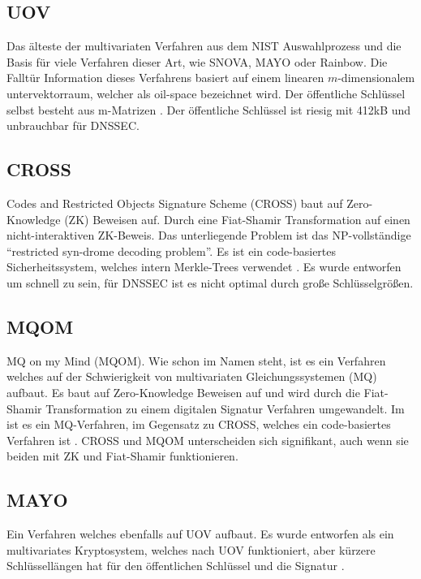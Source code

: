 \subsection{UOV}
Das älteste der multivariaten Verfahren aus dem NIST Auswahlprozess und die Basis für viele Verfahren dieser Art, wie SNOVA, MAYO oder Rainbow.
Die Falltür Information dieses Verfahrens basiert auf einem linearen $m$-dimensionalem untervektorraum, welcher als oil-space bezeichnet wird.
Der öffentliche Schlüssel selbst besteht aus m-Matrizen \cite{saarinenPostQuantumCryptography15th2024}.
Der öffentliche Schlüssel ist riesig mit 412kB und unbrauchbar für DNSSEC.

\subsection{CROSS}
Codes and Restricted Objects Signature Scheme (CROSS) baut auf Zero-Knowledge (ZK) Beweisen auf.
Durch eine Fiat-Shamir Transformation auf einen nicht-interaktiven ZK-Beweis.
Das unterliegende Problem ist das NP-vollständige \enquote{restricted syn-drome decoding problem}.
Es ist ein code-basiertes Sicherheitssystem, welches intern Merkle-Trees verwendet \cite{baldiAlgorithmSpecificationsSupporting2025,saarinenPostQuantumCryptography15th2024}.
Es wurde entworfen um schnell zu sein, für DNSSEC ist es nicht optimal durch große Schlüsselgrößen.

\subsection{MQOM}
MQ on my Mind (MQOM).
Wie schon im Namen steht, ist es ein Verfahren welches auf der Schwierigkeit von multivariaten Gleichungssystemen (MQ) aufbaut.
Es baut auf Zero-Knowledge Beweisen auf und wird durch die Fiat-Shamir Transformation zu einem digitalen Signatur Verfahren umgewandelt.
Im ist es ein MQ-Verfahren, im Gegensatz zu CROSS, welches ein code-basiertes Verfahren ist \cite{benadjilaMQMyMind2023}.
CROSS und MQOM unterscheiden sich signifikant, auch wenn sie beiden mit ZK und Fiat-Shamir funktionieren.

\subsection{MAYO}
Ein Verfahren welches ebenfalls auf UOV aufbaut.
Es wurde entworfen als ein multivariates Kryptosystem, welches nach UOV funktioniert, aber kürzere Schlüssellängen hat für den öffentlichen Schlüssel und die Signatur \cite{teamMAYO}.

